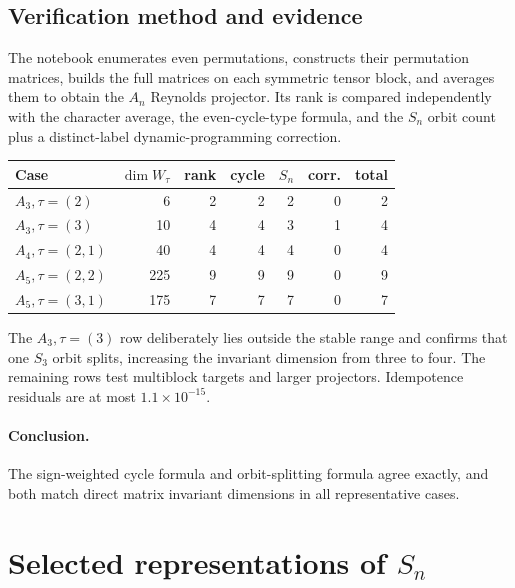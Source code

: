 \documentclass[10pt]{article}
\newcommand{\Sym}{\operatorname{Sym}}
\begin{document}
\subsection{Verification method and evidence}
The notebook enumerates even permutations, constructs their permutation
matrices, builds the full matrices on each symmetric tensor block, and averages
them to obtain the $A_n$ Reynolds projector.  Its rank is compared independently
with the character average, the even-cycle-type formula, and the $S_n$ orbit
count plus a distinct-label dynamic-programming correction.

\begin{center}
\small
\begin{tabular}{@{}lrrrrrr@{}}
\toprule
Case & $\dim W_\tau$ & rank & cycle & $S_n$ & corr. & total\\
\midrule
$A_3,\tau=(2)$ & 6 & 2 & 2 & 2 & 0 & 2\\
$A_3,\tau=(3)$ & 10 & 4 & 4 & 3 & 1 & 4\\
$A_4,\tau=(2,1)$ & 40 & 4 & 4 & 4 & 0 & 4\\
$A_5,\tau=(2,2)$ & 225 & 9 & 9 & 9 & 0 & 9\\
$A_5,\tau=(3,1)$ & 175 & 7 & 7 & 7 & 0 & 7\\
\bottomrule
\end{tabular}
\end{center}
The $A_3,\tau=(3)$ row deliberately lies outside the stable range and confirms
that one $S_3$ orbit splits, increasing the invariant dimension from three to
four.  The remaining rows test multiblock targets and larger projectors.
Idempotence residuals are at most $1.1\times10^{-15}$.

\paragraph{Conclusion.}
The sign-weighted cycle formula and orbit-splitting formula agree exactly, and
both match direct matrix invariant dimensions in all representative cases.
\endgroup


\clearpage
\section[Selected representations of S-n]{Selected representations of $S_n$}\label{proof:symmetric-representations}
\begingroup
\providecommand{\Sym}{\operatorname{Sym}}
\renewcommand{\Sym}{\operatorname{Sym}}
\providecommand{\tr}{\operatorname{Tr}}
\renewcommand{\tr}{\operatorname{Tr}}
\setcounter{theorem}{0}
\setcounter{proposition}{0}
\setcounter{lemma}{0}
\setcounter{corollary}{0}
\setcounter{remark}{0}
\begin{abstract}
We verify the $\sigma$-MGF formulas for the sign and standard representations
of $S_n$, the symmetric/exterior/tensor character constructions, and the
induced representation $\operatorname{Ind}_{C_3}^{S_3}\omega$.  Matrices are
constructed element by element.  Reynolds ranks, character averages, cycle
formulas, and decorated coset-cycle determinants agree in all small cases.
\end{abstract}
\end{document}
